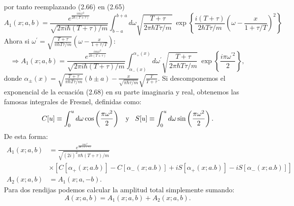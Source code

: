 por tanto reemplazando (2.66) en (2.65)
\begin{equation}
A_{1}(x;a,b)=\frac{e^{\frac{imx^{2}}{2\hbar(T+\tau)}}}{\sqrt{2\pi i\hbar(T+\tau)/m}}\int_{b-a}^{b+a}d\omega\sqrt{\frac{T+\tau}{2\pi\hbar T\tau/m}}\ \exp\left\{ \frac{i(T+\tau)}{2\hbar T\tau/m}\left(\omega-\frac{x}{1+\tau/T}\right)^{2}\right\}
\end{equation}
Ahora si $\omega^{\prime}=\sqrt{\frac{T+\tau}{\pi\hbar T\tau/m}}\left(\omega-\frac{x}{1+\tau/T}\right)$:
\begin{equation}
\Rightarrow A_{1}(x;a,b)=\frac{e^{\frac{imx^{2}}{2\hbar(T+\tau)}}}{\sqrt{2\pi i\hbar(T+\tau)/m}}\int_{\alpha_{-}(x)}^{\alpha_{+}(x)}d\omega^{\prime}\sqrt{\frac{T+\tau}{2\pi\hbar T\tau/m}}\ \exp\left\{ \frac{i\pi\omega^{\prime 2}}{2}\right\} ,
\end{equation}
donde $\alpha_{\pm}(x)=\sqrt{\frac{T+\tau}{\pi\hbar T\tau/m}}(b\pm a)-\frac{x}{\sqrt{\pi\hbar\tau/m}}\sqrt{\frac{T}{T+\tau}}$.
Si descomponemos el exponencial de la ecuación (2.68) en su parte imaginaria y real, obtenemos las famosas integrales de Fresnel, definidas como:
\begin{equation}
C[u]\equiv \int_{0}^{u}d\omega \cos\left(\frac{\pi\omega ^2 }{2}\right)\hspace{0.3cm} \text{y}\hspace{0.3cm} S[u]\equiv \int_{0}^{u}d\omega \sin\left(\frac{\pi\omega ^2 }{2}\right) .
\end{equation}
De esta forma:
\begin{align}
\nonumber A_{1}(x;a,b)&=\frac{e^{\frac{imx^{2}}{2\hbar(T+\tau)}}}{\sqrt{(2i)^{2}\pi\hbar(T+\tau)/m}}\\
&\times[C[\alpha_{+}(x;a.b)]-C[\alpha_{-}(x;a.b)]+iS[\alpha_{+}(x;a.b)]-iS[\alpha_{-}(x;a.b)]]\\
A_{2}(x;a,b)&=A_{1}(x;a,-b).
\end{align}
Para dos rendijas podemos calcular la amplitud total simplemente sumando:
\begin{equation}
A(x;a,b)=A_{1}(x;a,b)+A_{2}(x;a,b).
\end{equation}


